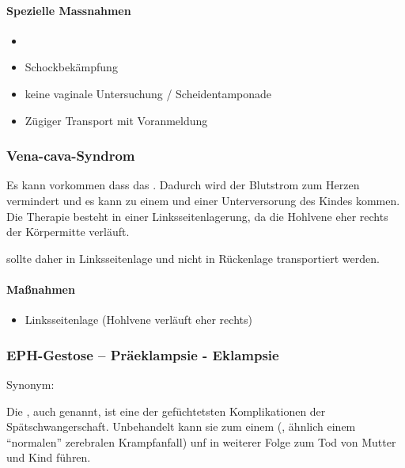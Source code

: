 \begin{gMassnahmenEnv}
    \paragraph{Spezielle Massnahmen}
    \begin{itemize}
        \item \gTxMassVitBes
        \item Schockbekämpfung
        \item keine vaginale Untersuchung /  Scheidentamponade
        \item Z\"ugiger Transport mit Voranmeldung
    \end{itemize}
\end{gMassnahmenEnv}


\subsubsection{Vena-cava-Syndrom}

Es kann vorkommen dass das . Dadurch wird der Blutstrom zum Herzen
vermindert und es kann zu einem und einer Unterversorung des Kindes kommen. Die
Therapie besteht in einer Linksseitenlagerung, da die Hohlvene eher
rechts der Körpermitte verläuft. 

{\mdseries
{}sollte daher in
Linksseitenlage und nicht in R\"uckenlage transportiert werden. }

\paragraph{Ma{\ss}nahmen}

\begin{itemize}
    \item Linksseitenlage (Hohlvene verläuft eher rechts)
\end{itemize}

\subsubsection{EPH-Gestose -- Präeklampsie - Eklampsie}
\label{topic:eph-gestose}

Synonym: 

Die , auch  genannt,
ist eine der gefüchtetsten Komplikationen der Spätschwangerschaft.
Unbehandelt kann sie zum einem  (, ähnlich einem "`normalen"'
zerebralen Krampfanfall) unf in weiterer Folge zum Tod von Mutter und Kind führen. 

